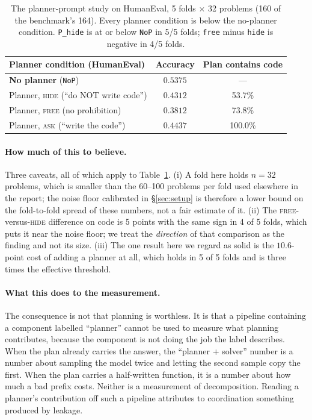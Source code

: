 \documentclass[11pt,a4paper]{article}
\begin{document}
\begin{table}[h]\centering\small
\begin{tabular}{@{}l c c@{}}
\toprule
Planner condition (HumanEval) & Accuracy & Plan contains code\\
\midrule
\textbf{No planner} (\texttt{NoP}) & $\mathbf{0.5375}$ & ---\\
Planner, \textsc{hide} (``do NOT write code'') & $0.4312$ & 53.7\%\\
Planner, \textsc{free} (no prohibition) & $0.3812$ & 73.8\%\\
Planner, \textsc{ask} (``write the code'') & $0.4437$ & 100.0\%\\
\bottomrule
\end{tabular}
\caption{The planner-prompt study on HumanEval, 5 folds $\times$ 32 problems (160 of the
benchmark's 164). Every planner condition is below the no-planner condition. \texttt{P\_hide} is at
or below \texttt{NoP} in 5/5 folds; \texttt{free} minus \texttt{hide} is negative in 4/5 folds.}
\label{tab:planner}
\end{table}

\paragraph{How much of this to believe.} Three caveats, all of which apply to Table~\ref{tab:planner}. (i) A fold here holds $n=32$ problems, which is smaller than the 60--100 problems per fold used elsewhere in the report; the noise floor calibrated in \S\ref{sec:setup} is therefore a lower bound on the fold-to-fold spread of these numbers, not a fair estimate of it. (ii) The \textsc{free}-versus-\textsc{hide} difference on code is 5 points with the same sign in 4 of 5 folds, which puts it near the noise floor; we treat the \emph{direction} of that comparison as the finding and not its size. (iii) The one result here we regard as solid is the $10.6$-point cost of adding a planner at all, which holds in 5 of 5 folds and is three times the effective threshold.

\paragraph{What this does to the measurement.} The consequence is not that planning is worthless. It is that a pipeline containing a component labelled ``planner'' cannot be used to measure what planning contributes, because the component is not doing the job the label describes. When the plan already carries the answer, the ``planner + solver'' number is a number about sampling the model twice and letting the second sample copy the first. When the plan carries a half-written function, it is a number about how much a bad prefix costs. Neither is a measurement of decomposition. Reading a planner's contribution off such a pipeline attributes to coordination something produced by leakage.
\end{document}
